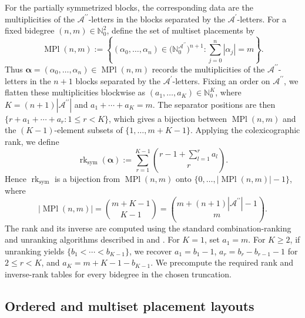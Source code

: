 \documentclass{amsart}
\theoremstyle{definition}
\theoremstyle{remark}
\begin{document}
For the partially symmetrized blocks, the corresponding  data are
the multiplicities of the $\mathcal{A}^{\prime\prime}$-letters in the
blocks separated by the $\mathcal{A}^{\prime}$-letters. For a fixed
bidegree $(n,m)\in\mathbb{N}_0^2$, define the set of multiset placements by
\[
    \operatorname{MPl}(n,m)
    :=
    \left\{
        (\alpha_0,\ldots,\alpha_n)
        \in
        \bigl(
            \mathbb{N}_0^{\mathcal{A}^{\prime\prime}}
        \bigr)^{n+1}
        :
        \sum_{j=0}^{n}|\alpha_j|=m
    \right\}.
\]
Thus
$\boldsymbol{\alpha}
=(\alpha_0,\ldots,\alpha_n)
\in\operatorname{MPl}(n,m)$
records the multiplicities of the
$\mathcal{A}^{\prime\prime}$-letters in the $n+1$ blocks separated by the
$\mathcal{A}^{\prime}$-letters. Fixing an order on
$\mathcal{A}^{\prime\prime}$, we flatten these multiplicities blockwise as
$(a_1,\ldots,a_K)\in\mathbb{N}_0^K$, where
$K=(n+1)|\mathcal{A}^{\prime\prime}|$ and
$a_1 + \cdots + a_K =m$. The separator positions are then
$\{r+a_1+\cdots+a_r :1\leq r<K\}$, which gives a bijection between
$\operatorname{MPl}(n,m)$ and the $(K-1)$-element subsets of
$\{1,\ldots,m+K-1\}$. Applying the colexicographic rank, we define
\begin{equation}\label{eq:rk_sym}
    \operatorname{rk}_{\mathrm{sym}}(\boldsymbol{\alpha})
    :=
    \sum_{r=1}^{K-1}
    \binom{r-1+\sum_{l=1}^r a_l}{r}.
\end{equation}
Hence $\operatorname{rk}_{\mathrm{sym}}$ is a bijection from
$\operatorname{MPl}(n,m)$ onto
$\{0,\ldots,|\operatorname{MPl}(n,m)|-1\}$, where
\[
    |\operatorname{MPl}(n,m)|
    =
    \binom{m+K-1}{K-1}
    =
    \binom{m+(n+1)|\mathcal{A}^{\prime\prime}|-1}{m}.
\]
The rank and its inverse are computed using the standard combination-ranking
and unranking algorithms described in
\cite[Sec.~7.2.1.3, Exercise~17]{knuth2011taocp4a}
and \cite{fraenkelMor1983}. For $K=1$, set $a_1=m$. For $K\geq2$, if
unranking yields
$\{b_1<\cdots<b_{K-1}\}$, we recover
$a_1=b_1-1$,
$a_r=b_r-b_{r-1}-1$ for $2\leq r<K$, and
$a_K=m+K-1-b_{K-1}$. We precompute the required rank and inverse-rank tables
for every bidegree in the chosen truncation.

\subsection{Ordered and multiset placement layouts}
\label{sec:placement_layouts}
\end{document}
